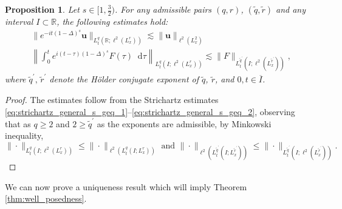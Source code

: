 \documentclass[12pt,a4paper]{amsart}
\newtheorem{prop}[theorem]{Proposition}
\numberwithin{equation}{section}
\newcommand{\ulu}{\boldsymbol{u}}
\newcommand*\diff{\mathop{}\!\mathrm{d}}
\begin{document}
	\begin{prop}
		Let $ s \in [1,\frac32) $. For any admissible pairs $(q,r)$, $(\tilde{q},\tilde{r})$ and any interval $I \subset \mathbb{R} $, the following estimates hold: 
		\begin{align}
			&\| e^{-it(1-\Delta)^s} \ulu \|_{L^q_t(\mathbb{R};\ell^2(L^{r}_x))} \lesssim \| \ulu \|_{\ell^2(L^2_x)} \\
			&\left\| \int_{0}^t e^{i(t-\tau)(1-\Delta)^s} F(\tau) \diff \tau \right\|_{L^q_t(I;\ell^2(L^r_x))} \lesssim \| F \|_{L^{\tilde{q}^\prime}_t(I;\ell^2(L^{\tilde{r}^\prime}_x))} , \label{est:strichartz_retarded}
		\end{align}
		where $\tilde{q}^\prime, \, \tilde{r}^\prime $ denote the H\"older conjugate exponent of $\tilde q$, $\tilde r$, and $0,t \in \overline{I}$.
	\end{prop}
	\begin{proof}
		The estimates follow from the Strichartz estimates  \eqref{eq:strichartz_general_s_geq_1}--\eqref{eq:strichartz_general_s_geq_2}, observing that as $ q \geq 2 $ and $ 2 \geq \tilde{q}^\prime $ as the exponents are admissible, by Minkowski inequality,
		\begin{equation}
			\| \cdot \|_{L^q_t(I;\ell^2(L^r_x))} \leq  \| \cdot \|_{\ell^2(L^q_t(I;L^r_x))} \text{  and  } \| \cdot \|_{\ell^2(L^{\tilde{q}^\prime}_t(I;L^{\tilde{r}^\prime}_x))} \leq  \| \cdot \|_{L^{\tilde{q}^\prime}_t(I;\ell^2(L^{\tilde{r}^\prime}_x))} .
		\end{equation}
	\end{proof}
	
	We can now prove a uniqueness result which will imply Theorem \ref{thm:well_posedness}.
	
\end{document}
